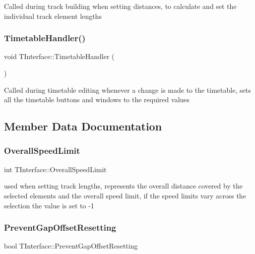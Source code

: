 Called during track building when setting distances, to calculate and set the individual track element lengths \mbox{\label{class_t_interface_a4502fb89b8be8afeaf2771fbe5d0cd75}} 
\subsubsection{\texorpdfstring{Timetable\+Handler()}{TimetableHandler()}}
{\footnotesize\ttfamily void T\+Interface\+::\+Timetable\+Handler (\begin{DoxyParamCaption}{ }\end{DoxyParamCaption})\hspace{0.3cm}{\ttfamily [private]}}

Called during timetable editing whenever a change is made to the timetable, sets all the timetable buttons and windows to the required values 

\subsection{Member Data Documentation}
\mbox{\label{class_t_interface_acc810716df0d41cad86bcba2027ff93e}} 
\subsubsection{\texorpdfstring{Overall\+Speed\+Limit}{OverallSpeedLimit}}
{\footnotesize\ttfamily int T\+Interface\+::\+Overall\+Speed\+Limit\hspace{0.3cm}{\ttfamily [private]}}

used when setting track lengths, represents the overall distance covered by the selected elements and the overall speed limit, if the speed limits vary across the selection the value is set to -\/1 \mbox{\label{class_t_interface_ae6c305a014fd20195a90258578a7bcee}} 
\subsubsection{\texorpdfstring{Prevent\+Gap\+Offset\+Resetting}{PreventGapOffsetResetting}}
{\footnotesize\ttfamily bool T\+Interface\+::\+Prevent\+Gap\+Offset\+Resetting\hspace{0.3cm}{\ttfamily [private]}}

